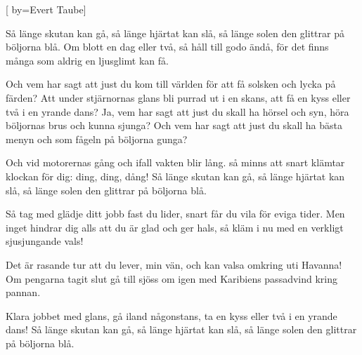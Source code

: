 


[ 	%
	by={Evert Taube}]		%
	
\beginverse*		%
Så länge skutan kan gå,
så länge hjärtat kan slå,
så länge solen den glittrar på böljorna blå.
Om blott en dag eller två,
så håll till godo ändå,
för det finns många som aldrig en ljusglimt kan få.
\endverse			%

\beginverse*		%
Och vem har sagt att just du kom till världen
för att få solsken och lycka på färden?
Att under stjärnornas glans
bli purrad ut i en skans,
att få en kyss eller två i en yrande dans?
Ja, vem har sagt att just du skall ha hörsel och syn,
höra böljornas brus och kunna sjunga?
Och vem har sagt att just du skall ha bästa menyn
och som fågeln på böljorna gunga?
\endverse			%

\beginverse*		%
Och vid motorernas gång
och ifall vakten blir lång.
så minns att snart klämtar klockan för dig:
ding, ding, dång!
Så länge skutan kan gå,
så länge hjärtat kan slå,
så länge solen den glittrar på böljorna blå.
\endverse			%

\beginverse*		%
Så tag med glädje ditt jobb fast du lider,
snart får du vila för eviga tider.
Men inget hindrar dig alls
att du är glad och ger hals,
så kläm i nu med en verkligt sjusjungande vals!
\endverse			%

\beginverse*		%
Det är rasande tur att du lever, min vän,
och kan valsa omkring uti Havanna!
Om pengarna tagit slut gå till sjöss om igen 
med Karibiens passadvind kring pannan.
\endverse			%

\beginverse*		%
Klara jobbet med glans,
gå iland någonstans,
ta en kyss eller två i en yrande dans!
Så länge skutan kan gå,
så länge hjärtat kan slå,
så länge solen den glittrar på böljorna blå.
\endverse			%
\endsong			%
